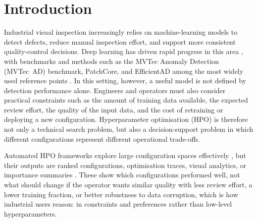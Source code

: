 \documentclass[final,5p,times,twocolumn]{elsarticle}
\begin{document}
\section{Introduction}
\label{sec:introduction}

Industrial visual inspection increasingly relies on machine-learning
models to detect defects, reduce manual inspection effort, and support
more consistent quality-control decisions. Deep learning has driven
rapid progress in this area \cite{xie_deep_2024}, with benchmarks and
methods such as the MVTec Anomaly Detection (MVTec~AD) benchmark,
PatchCore, and EfficientAD among the most
widely used reference points
\cite{bergmann_mvtec_2019,roth_towards_2022,batzner_efficientad_2024}.
In this setting, however, a useful model is not defined by detection
performance alone. Engineers and operators must also consider practical
constraints such as the amount of training data available, the expected
review effort, the quality of the input data, and the cost of
retraining or deploying a new configuration. Hyperparameter
optimisation (HPO) is therefore not only a technical search problem,
but also a decision-support problem in which different configurations
represent different operational trade-offs.

Automated HPO frameworks explore large configuration spaces
effectively \cite{10.1145/3292500.3330701,eggensperger_hpobench_2021},
but their outputs are ranked configurations, optimisation traces,
visual analytics, or importance summaries
\cite{NEURIPS2021_12ced2db,zoller_xautoml_2023,mu_shrinkhpo_2024}. These
show which configurations performed well, not what should change if the
operator wants similar quality with less review effort, a lower
training fraction, or better robustness to data corruption, which is
how industrial users reason: in constraints and preferences rather
than low-level hyperparameters.
\end{document}
